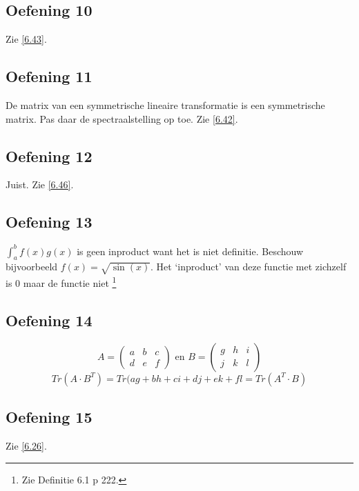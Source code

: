 \documentclass[lineaire_algebra_oplossingen.tex]{subfiles}
\begin{document}
\subsection{Oefening 10}
Zie \ref{6.43}.

\subsection{Oefening 11}
De matrix van een symmetrische lineaire transformatie is een symmetrische matrix. Pas daar de spectraalstelling op toe. Zie \ref{6.42}.

\subsection{Oefening 12}
Juist. Zie \ref{6.46}.

\subsection{Oefening 13}
$\int_a^bf(x)g(x)$ is geen inproduct want het is niet definitie. Beschouw bijvoorbeeld $f(x) = \sqrt{\sin(x)}$. Het `inproduct' van deze functie met zichzelf is $0$ maar de functie niet \footnote{Zie Definitie 6.1 p 222.}

\subsection{Oefening 14}
\[
A = 
\begin{pmatrix}
a & b & c\\
d & e & f
\end{pmatrix}
\text{ en }
B = 
\begin{pmatrix}
g & h & i\\
j & k & l
\end{pmatrix}
\]
\[
Tr(A\cdot B^T) = 
Tr(
ag + bh + ci + dj + ek + fl
= Tr(A^T\cdot B)
\]

\subsection{Oefening 15}
Zie \ref{6.26}.
\end{document}
